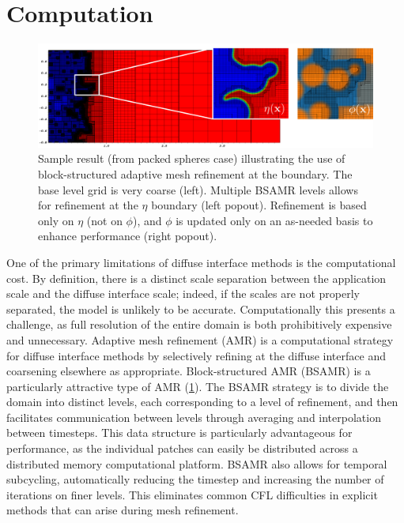 \documentclass[colorinlistoftodos,review]{elsarticle}
\begin{document}
\section{Computation}  \label{Computation} 

\begin{figure}
  \centering
  \includegraphics[width=\linewidth]{figures/amr.pdf}
  \caption{
    Sample result (from packed spheres case) illustrating the use of block-structured adaptive mesh refinement at the boundary.
    The base level grid is very coarse (left).
    Multiple BSAMR levels allows for refinement at the $\eta$ boundary (left popout).
    Refinement is based only on $\eta$ (not on $\phi$), and $\phi$ is updated only on an as-needed basis to enhance performance (right popout).
  }
  \label{fig:amr}
\end{figure}

One of the primary limitations of diffuse interface methods is the computational cost.
By definition, there is a distinct scale separation between the application scale and the diffuse interface scale; indeed, if the scales are not properly separated, the model is unlikely to be accurate.
Computationally this presents a challenge, as full resolution of the entire domain is both prohibitively expensive and unnecessary.
Adaptive mesh refinement (AMR) is a computational strategy for diffuse interface methods by selectively refining at the diffuse interface and coarsening elsewhere as appropriate.
Block-structured AMR (BSAMR) is a particularly attractive type of AMR (\cref{fig:amr}).
The BSAMR strategy is to divide the domain into distinct levels, each corresponding to a level of refinement, and then facilitates communication between levels through averaging and interpolation between timesteps.
This data structure is particularly advantageous for performance, as the individual patches can easily be distributed across a distributed memory computational platform.
BSAMR also allows for temporal subcycling, automatically reducing the timestep and increasing the number of iterations on finer levels.
This eliminates common CFL difficulties in explicit methods that can arise during mesh refinement.
\end{document}
